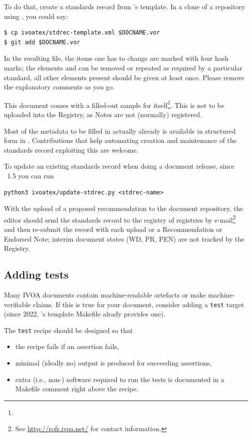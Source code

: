 \documentclass[11pt,a4paper]{ivoa}
\begin{document}
To do that, create a standards record from \ivoatex's template.  In a
clone of a repository using \ivoatex, you could say:

\begin{lstlisting}
$ cp ivoatex/stdrec-template.xml $DOCNAME.vor
$ git add $DOCNAME.vor
\end{lstlisting}

In the resulting file, the items one has to change are marked with four
hash marks; the elements  and  can be removed
or repeated as required by a particular standard, all other elements
present should be given at least once.  Please remove the explanatory
comments as you go.

This document comes with a filled-out sample for
itself\footnote{}.  This is
not to be uploaded into the Registry, as Notes are not (normally)
registered.

Most of the metadata to be filled in actually already is available in
structured form in \ivoatex.  Contributions that help automating
creation and maintenance of the standards record exploiting this are welcome.

To update an existing standards record when doing a document release,
since \ivoatex~1.5 you can run

\begin{lstlisting}
python3 ivoatex/update-stdrec.py <stdrec-name>
\end{lstlisting}

With the upload of a proposed recommendation to the document repository,
the editor should send the standards record to the registry of
registries by e-mail\footnote{See \url{http://rofr.ivoa.net/} for
contact information.} and then re-submit the record with each upload or
a Recommendation or Endorsed Note; interim document states (WD, PR, PEN)
are not tracked by the Registry.


\subsection{Adding tests}
\label{sect:tests}

Many IVOA documents contain machine-readable artefacts or make
machine-verifiable claims.  If this is true for your document, consider
adding a \verb|test| target (since 2022, \ivoatex's template Makefile
alrady provides one).

The \verb|test| recipe should be designed so that

\begin{itemize}
\item the recipe fails if an assertion fails,
\item minimal (ideally no) output is produced for succeeding assertions,
\item extra (i.e., non-\ivoatex) software required to run the tests is
documented in a Makefile comment right above the recipe.
\end{itemize}
\end{document}
